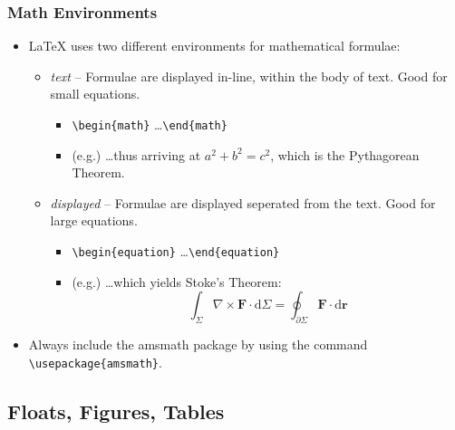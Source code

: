 \documentclass{beamer}
\begin{document}
\begin{frame}[containsverbatim]
    \frametitle{Math Environments}
    \begin{itemize}
        \item \LaTeX { uses} two different environments for mathematical formulae:
        \begin{itemize}
            \item \emph{text} -- Formulae are displayed in-line, within the body of text. Good for small equations.
            \begin{itemize}
                \item \verb|\begin{math}| \ldots \verb|\end{math}|
                \item (e.g.) \ldots thus arriving at \begin{math} a^2 + b^2 = c^2 \end{math}, which is the Pythagorean Theorem.
            \end{itemize}
            \item \emph{displayed} -- Formulae are displayed seperated from the text. Good for large equations.
            \begin{itemize}
            \item \verb|\begin{equation}| \ldots \verb|\end{equation}|
            \item (e.g.) \ldots which yields Stoke's Theorem: \begin{equation} \int_\Sigma \nabla \times \mathbf{F} \cdot \mathrm{d}\Sigma = \oint_{\partial\Sigma} \mathbf{F} \cdot \mathrm{d}\mathbf{r} \end{equation}
            \end{itemize}
        \end{itemize}
    \item Always include the amsmath package by using the command \verb|\usepackage{amsmath}|.
    \end{itemize}
\end{frame}

\subsection{Floats, Figures, Tables}
\end{document}

